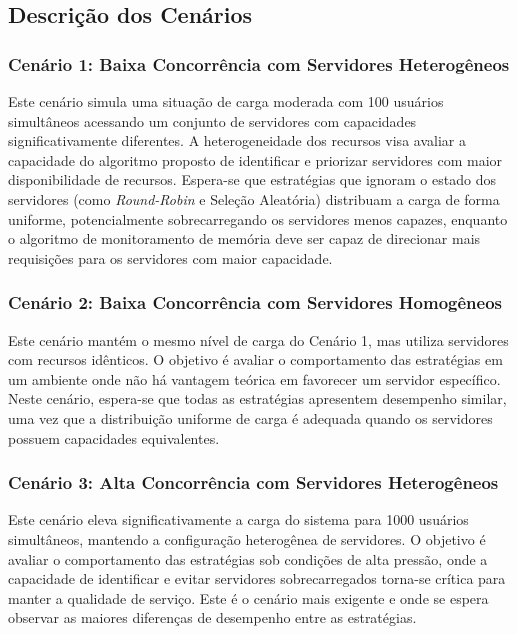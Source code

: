 \subsection{Descrição dos Cenários}

\subsubsection{Cenário 1: Baixa Concorrência com Servidores Heterogêneos}

Este cenário simula uma situação de carga moderada com 100 usuários simultâneos acessando um conjunto de servidores com capacidades significativamente diferentes. A heterogeneidade dos recursos visa avaliar a capacidade do algoritmo proposto de identificar e priorizar servidores com maior disponibilidade de recursos. Espera-se que estratégias que ignoram o estado dos servidores (como \textit{Round-Robin} e Seleção Aleatória) distribuam a carga de forma uniforme, potencialmente sobrecarregando os servidores menos capazes, enquanto o algoritmo de monitoramento de memória deve ser capaz de direcionar mais requisições para os servidores com maior capacidade.

\subsubsection{Cenário 2: Baixa Concorrência com Servidores Homogêneos}

Este cenário mantém o mesmo nível de carga do Cenário 1, mas utiliza servidores com recursos idênticos. O objetivo é avaliar o comportamento das estratégias em um ambiente onde não há vantagem teórica em favorecer um servidor específico. Neste cenário, espera-se que todas as estratégias apresentem desempenho similar, uma vez que a distribuição uniforme de carga é adequada quando os servidores possuem capacidades equivalentes.

\subsubsection{Cenário 3: Alta Concorrência com Servidores Heterogêneos}

Este cenário eleva significativamente a carga do sistema para 1000 usuários simultâneos, mantendo a configuração heterogênea de servidores. O objetivo é avaliar o comportamento das estratégias sob condições de alta pressão, onde a capacidade de identificar e evitar servidores sobrecarregados torna-se crítica para manter a qualidade de serviço. Este é o cenário mais exigente e onde se espera observar as maiores diferenças de desempenho entre as estratégias.

